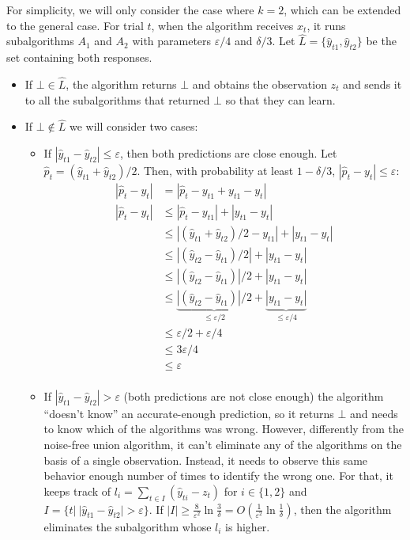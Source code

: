 For simplicity, we will only consider the case where $k = 2$, which can be
extended to the general case. For trial $t$, when the algorithm receives $x_t$,
it runs subalgorithms $A_1$ and $A_2$ with parameters $\varepsilon/4$ and
$\delta/3$. Let $\hat{L} = \{\hat{y}_{t1}, \hat{y}_{t2}\}$ be the set containing
both responses.
\begin{itemize}
  \item If $\bot \in \hat{L}$, the algorithm returns $\bot$ and obtains the
  observation $z_t$ and sends it to all the subalgorithms that returned $\bot$
  so that they can learn.
  \item If $\bot \notin \hat{L}$ we will consider two cases:
  \begin{itemize}
    \item If $|\hat{y}_{t1} - \hat{y}_{t2}| \leq \varepsilon$, then both predictions
    are close enough. Let $\hat{p}_t = (\hat{y}_{t1} + \hat{y}_{t2})/2 $. Then,
    with probability at least $1 - \delta/3$, $|\hat{p}_t - y_t| \leq \varepsilon$:
    \begin{align*}
    |\hat{p}_t - y_t| &= |\hat{p}_t - y_{t1} + y_{t1} - y_t| \\
    |\hat{p}_t - y_t| &\leq |\hat{p}_t - y_{t1}| + |y_{t1} - y_t| \\
                      &\leq |(\hat{y}_{t1} + \hat{y}_{t2})/2 - y_{t1}| + |y_{t1} - y_t| \\
                      &\leq |(\hat{y}_{t2} - \hat{y}_{t1})/2| + |y_{t1} - y_t| \\
                      &\leq |(\hat{y}_{t2} - \hat{y}_{t1})|/2 + |y_{t1} - y_t| \\
                      &\leq \underbrace{|(\hat{y}_{t2} - \hat{y}_{t1})|/2}_{\leq \varepsilon/2} + \underbrace{|y_{t1} - y_t|}_{\leq \varepsilon/4} \\
                      &\leq \varepsilon/2 + \varepsilon/4 \\
                      &\leq 3\varepsilon/4 \\
                      &\leq \varepsilon \\
    \end{align*}
    \item If $|\hat{y}_{t1} - \hat{y}_{t2}| > \varepsilon$ (both predictions
    are not close enough) the algorithm ``doesn't know'' an accurate-enough
    prediction, so it returns $\bot$ and needs to know which of the algorithms
    was wrong. However, differently from the noise-free union algorithm, it
    can't eliminate any of the algorithms on the basis of a single observation.
    Instead, it needs to observe this same behavior enough number of times to
    identify the wrong one. For that, it keeps track of $l_i = \sum_{t \in I}
    (\hat{y}_{ti} - z_t)$ for $i \in \{1, 2\}$ and $I = \{t | \ |\hat{y}_{t1} -
    \hat{y}_{t2}| > \varepsilon\}$. If $|I| \geq
    \frac{8}{\varepsilon^2} \ln \frac{3}{\delta} = O\left( \frac{1}{\varepsilon^2}
    \ln \frac{1}{\delta} \right)$, then the algorithm eliminates the subalgorithm
    whose $l_i$ is higher.
  \end{itemize}
\end{itemize}

